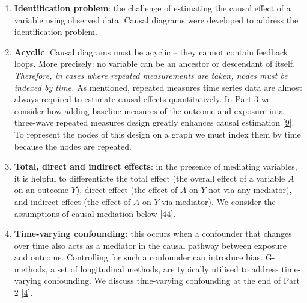 \documentclass[
  singlecolumn]{article}
\begin{document}
\begin{enumerate}
\def\labelenumi{\arabic{enumi}.}
\setcounter{enumi}{11}
\item
  \textbf{Identification problem}: the challenge of estimating the
  causal effect of a variable using observed data. Causal diagrams were
  developed to address the identification problem.
\item
  \textbf{Acyclic}: Causal diagrams must be acyclic -- they cannot
  contain feedback loops. More precisely: no variable can be an ancestor
  or descendant of itself. \emph{Therefore, in cases where repeated
  measurements are taken, nodes must be indexed by time.} As mentioned,
  repeated measures time series data are almost always required to
  estimate causal effects quantitatively. In Part 3 we consider how
  adding baseline measures of the outcome and exposure in a three-wave
  repeated measures design greatly enhances causal estimation
  {[}\protect\hyperlink{ref-pearl2009}{9}{]}. To represent the nodes of
  this design on a graph we must index them by time because the nodes
  are repeated.
\item
  \textbf{Total, direct and indirect effects}: in the presence of
  mediating variables, it is helpful to differentiate the total effect
  (the overall effect of a variable \(A\) on an outcome \(Y\)), direct
  effect (the effect of \(A\) on \(Y\) not via any mediator), and
  indirect effect (the effect of \(A\) on \(Y\) via mediator). We
  consider the assumptions of causal mediation below
  {[}\protect\hyperlink{ref-vanderweele2015}{44}{]}.
\item
  \textbf{Time-varying confounding:} this occurs when a confounder that
  changes over time also acts as a mediator in the causal pathway
  between exposure and outcome. Controlling for such a confounder can
  introduce bias. G-methods, a set of longitudinal methods, are
  typically utilised to address time-varying confounding. We discuss
  time-varying confounding at the end of Part 2
  {[}\protect\hyperlink{ref-hernuxe1n2023}{4}{]}.
\end{enumerate}
\end{document}
